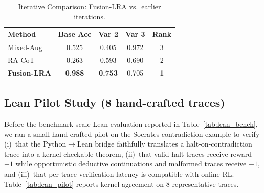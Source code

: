 \documentclass{article}
\begin{document}
\begin{table}[h]
\centering\small
\caption{Iterative Comparison: Fusion-LRA vs.\ earlier iterations.}
\label{tab:final_performance_comparison}
\begin{tabular}{lcccc}
\toprule
\textbf{Method} & \textbf{Base Acc} & \textbf{Var 2} & \textbf{Var 3} & \textbf{Rank} \\
\midrule
Mixed-Aug              & 0.525          & 0.405          & 0.972          & 3 \\
RA-CoT                 & 0.263          & 0.593          & 0.690          & 2 \\
\midrule
\textbf{Fusion-LRA}    & \textbf{0.988} & \textbf{0.753} & 0.705          & \textbf{1} \\
\bottomrule
\end{tabular}
\end{table}

\subsection{Lean Pilot Study (8 hand-crafted traces)}
\label{app:lean-pilot}

Before the benchmark-scale Lean evaluation reported in Table~\ref{tab:lean_bench}, we ran a small hand-crafted pilot on the Socrates contradiction example to verify (i)~that the Python$\to$Lean bridge faithfully translates a halt-on-contradiction trace into a kernel-checkable theorem, (ii)~that valid halt traces receive reward~$+1$ while opportunistic deductive continuations and malformed traces receive $-1$, and (iii)~that per-trace verification latency is compatible with online RL. Table~\ref{tab:lean_pilot} reports kernel agreement on $8$ representative traces.
\end{document}
